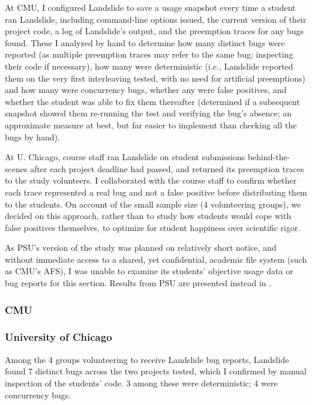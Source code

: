 At CMU, I configured Landslide to save a usage snapshot every time a student ran Landslide,
including command-line options issued, the current version of their project code,
a log of Landslide's output,
and the preemption traces for any bugs found.
These I analyzed by hand to determine how many distinct bugs were reported
(as multiple preemption traces may refer to the same bug; inspecting their code if necessary),
how many were deterministic
(i.e., Landslide reported them on the very first interleaving tested, with no need for artificial preemptions)
and how many were concurrency bugs,
whether any were false positives,
and whether the student was able to fix them thereafter
(determined if a subsequent snapshot showed them re-running the test and verifying the bug's absence;
an approximate measure at best, but far easier to implement than checking all the bugs by hand).

At U. Chicago,
course staff ran Landslide on student submissions behind-the-scenes
after each project deadline had passed,
and returned its preemption traces to the study volunteers.
I collaborated with the course staff
to confirm whether each trace represented a real bug and not a false positive
before distributing them to the students.
On account of the small sample size (4 volunteering groups),
we decided on this approach,
rather than to study how students would cope with false positives themselves,
to optimize for student happiness over scientific rigor.

As PSU's version of the study was planned on relatively short notice,
and without immediate access to a shared, yet confidential, academic file system (such as CMU's AFS),
I was unable to examine its students' objective usage data or bug reports for this section.
Results from PSU are presented instead in \sect{\ref{sec:education-eval-survey}}.

\subsubsection{CMU}
\label{sec:education-eval-bugs-cmu}

\subsubsection{University of Chicago}
\label{sec:education-eval-bugs-uc}

Among the 4 groups volunteering to receive Landslide bug reports,
Landslide found 7 distinct bugs across the two projects tested,
which I confirmed by manual inspection of the students' code.
3 among these were deterministic; 4 were concurrency bugs.

